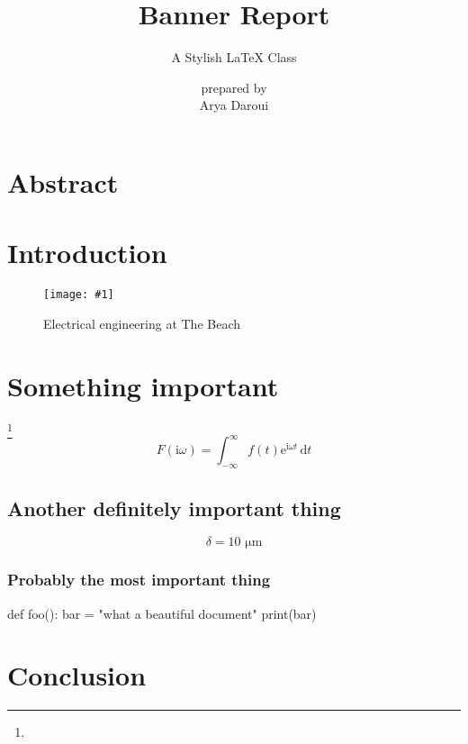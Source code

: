 \documentclass{bannerReport}
\title{Banner Report}
\subtitle{A Stylish \LaTeX \hspace{.008em} Class}
\author{ {\small prepared by} \\ Arya Daroui}
\newcommand{\fig}[2]{
	\begin{figure}[ht]
		\centering
		\texttt{[image: \#1]}
		\caption{#2}
	\end{figure}
}
\begin{document}

	\section*{Abstract}
		\lipsum[1]

	\section{Introduction}
		\lipsum[2]
		\fig{EE.pdf}{Electrical engineering at The Beach}

	\section{Something important}
		\lipsum[3] \footnote{\lipsum[10][1]}
		\begin{equation}
			F(\mathrm{i} \omega) = \int_{-\infty}^\infty f(t) \mathrm{e}^{\mathrm{i} \omega t} \, \mathrm{d}t
		\end{equation}	
	

		\subsection{Another definitely important thing}
			\lipsum[4]
			
			\begin{dent}
				\lipsum[2]
				$$
					\delta = 10 \text{ μm}
				$$
			\end{dent}


			
			\subsubsection{Probably the most important thing}
				\begin{code}
def foo():
	bar = "what a beautiful document"
	print(bar)
				\end{code}	

	\section{Conclusion}
		\lipsum[7]
\end{document}
